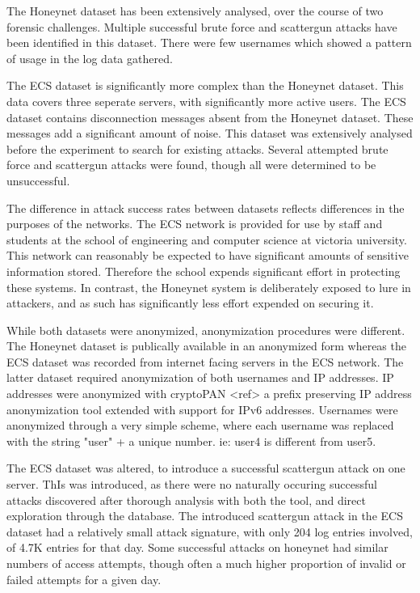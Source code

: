 The Honeynet dataset has been extensively analysed, over the course of two forensic challenges. Multiple successful brute force and scattergun attacks have been identified in this dataset. There were few usernames which showed a pattern of usage in the log data gathered. 

The ECS dataset is significantly more complex than the Honeynet dataset. This data covers three seperate servers, with significantly more active users. The ECS dataset contains disconnection messages absent from the Honeynet dataset. These messages add a significant amount of noise. This dataset was extensively analysed before the experiment to search for existing attacks. Several attempted brute force and scattergun attacks were found, though all were determined to be unsuccessful.  

The difference in attack success rates between datasets reflects differences in the purposes of the networks. The ECS network is provided for use by staff and students at the school of engineering and computer science at victoria university. This network can reasonably be expected to have significant amounts of sensitive information stored. Therefore the school expends significant effort in protecting these systems. In contrast, the Honeynet system is deliberately exposed to lure in attackers, and as such has significantly less effort expended on securing it.

While both datasets were anonymized, anonymization procedures were different. The Honeynet dataset is publically available in an anonymized form \cite{forensic10} whereas the ECS dataset was recorded from internet facing servers in the ECS network. The latter dataset required anonymization of both usernames and IP addresses. IP addresses were anonymized with cryptoPAN <ref> a prefix preserving IP address anonymization tool extended with support for IPv6 addresses. Usernames were anonymized through a very simple scheme, where each username was replaced with the string "user" + a unique number. ie: user4 is different from user5.

The ECS dataset was altered, to introduce a successful scattergun attack on one server. ThIs was introduced, as there were no naturally occuring successful attacks discovered after thorough analysis with both the tool, and direct exploration through the database.  
The introduced scattergun attack in the ECS dataset had a relatively small attack signature, with only 204 log entries involved, of 4.7K entries for that day. Some successful attacks on honeynet had similar numbers of access attempts, though often a much higher proportion of invalid or failed attempts for a given day. 

